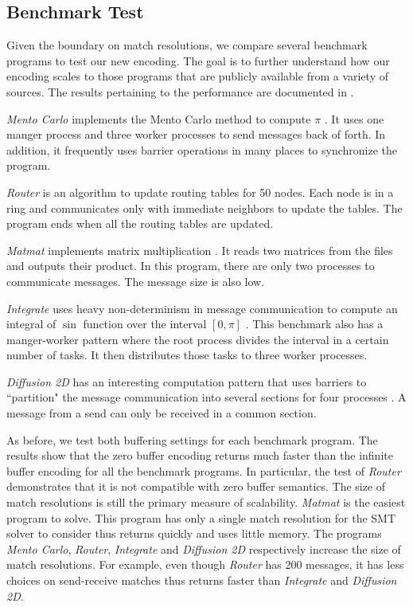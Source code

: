 \subsection{Benchmark Test}
Given the boundary on match resolutions, we compare several benchmark programs to test our new encoding. The goal is to further understand how our encoding scales to those programs that are publicly available from a variety of sources. The results pertaining to the performance are documented in . 

\begin{compactitem}

\item \textit{Mento Carlo} implements the Mento Carlo method to compute $\pi$ \cite{benchmark:mentoCarlo}. It uses one manger process and three worker processes to send messages back of forth. In addition, it frequently uses barrier operations in many places to synchronize the program. 
\item \textit{Router} is an algorithm to update routing tables for 50 nodes. Each node is in a ring and communicates only with immediate neighbors to update the tables. The program ends when all the routing tables are updated. 
\item \textit{Matmat} implements matrix multiplication \cite{benchmark:fevs}. It reads two matrices from the files and outputs their product. In this program, there are only two processes to communicate messages. The message size is also low.
\item \textit{Integrate} uses heavy non-determinism in message communication to compute an integral of $\sin$ function over the interval $[0, \pi]$ \cite{benchmark:fevs}. This benchmark also has a manger-worker pattern where the root process divides the interval in a certain number of tasks. It then distributes those tasks to three worker processes. %
\item \textit{Diffusion 2D} has an interesting computation pattern that uses barriers to ``partition" the message communication into several sections for four processes \cite{benchmark:fevs}. A message from a send can only be received in a common section. 
\end{compactitem}

As before, we test both buffering settings for each benchmark program. The results show that the zero buffer encoding returns much faster than the infinite buffer encoding for all the benchmark programs. In particular, the test of \textit{Router} demonstrates that it is not compatible with zero buffer semantics. The size of match resolutions is still the primary measure of scalability. \textit{Matmat} is the easiest program to solve. This program has only a single match resolution for the SMT solver to consider thus returns quickly and uses little memory. The programs \textit{Mento Carlo}, \textit{Router}, \textit{Integrate} and \textit{Diffusion 2D} respectively increase the size of match resolutions. For example, even though \textit{Router} has 200 messages, it has less choices on send-receive matches thus returns faster than \textit{Integrate} and \textit{Diffusion 2D}. 

